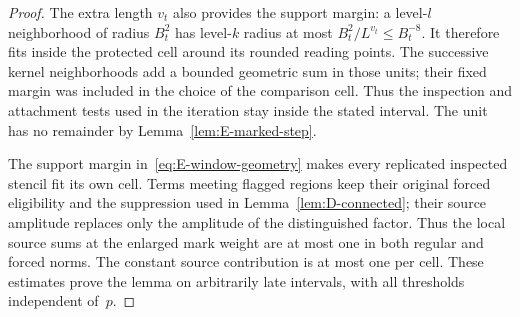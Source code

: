 \begin{proof}
The extra length $v_t$ also provides the support margin: a level-$l$ neighborhood of radius $B_t^2$ has level-$k$ radius at most $B_t^2/L^{v_t}\le B_t^{-8}$. It therefore fits inside the protected cell around its rounded reading points. The successive kernel neighborhoods add a bounded geometric sum in those units; their fixed margin was included in the choice of the comparison cell. Thus the inspection and attachment tests used in the iteration stay inside the stated interval. The unit has no remainder by Lemma~\ref{lem:E-marked-step}.

The support margin in~\eqref{eq:E-window-geometry} makes every replicated inspected stencil fit its own cell. Terms meeting flagged regions keep their original forced eligibility and the suppression used in Lemma~\ref{lem:D-connected}; their source amplitude replaces only the amplitude of the distinguished factor. Thus the local source sums at the enlarged mark weight are at most one in both regular and forced norms. The constant source contribution is at most one per cell. These estimates prove the lemma on arbitrarily late intervals, with all thresholds independent of~$p$.
\end{proof}

